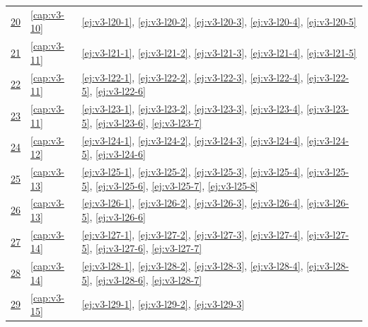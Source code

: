 {\begin{longtable}{@{}p{}p{}p{}@{}}
\href{https://drive.google.com/file/d/1Ys2jkIJ-7adEztSk6RGl4ztBA_OKQQ3G/view?usp=drivesdk}{20} & \ref{cap:v3-10} & \ref{ej:v3-l20-1}, \ref{ej:v3-l20-2}, \ref{ej:v3-l20-3}, \ref{ej:v3-l20-4}, \ref{ej:v3-l20-5} \\
\href{https://drive.google.com/file/d/1krgsZVlQzaqXGHSC2Lgj5padfhqT0eVS/view?usp=drivesdk}{21} & \ref{cap:v3-11} & \ref{ej:v3-l21-1}, \ref{ej:v3-l21-2}, \ref{ej:v3-l21-3}, \ref{ej:v3-l21-4}, \ref{ej:v3-l21-5} \\
\href{https://drive.google.com/file/d/18U-IUicazG7JKrD8dFOLbizRFvYHhrBy/view?usp=drivesdk}{22} & \ref{cap:v3-11} & \ref{ej:v3-l22-1}, \ref{ej:v3-l22-2}, \ref{ej:v3-l22-3}, \ref{ej:v3-l22-4}, \ref{ej:v3-l22-5}, \ref{ej:v3-l22-6} \\
\href{https://drive.google.com/file/d/1XkrNKnGp1XhTe2vJPWRVwAp-CsyaPm2l/view?usp=drivesdk}{23} & \ref{cap:v3-11} & \ref{ej:v3-l23-1}, \ref{ej:v3-l23-2}, \ref{ej:v3-l23-3}, \ref{ej:v3-l23-4}, \ref{ej:v3-l23-5}, \ref{ej:v3-l23-6}, \ref{ej:v3-l23-7} \\
\href{https://drive.google.com/file/d/1noqDj_y_3lDqzf6l07Zaq7fKG8sV4uyz/view?usp=drivesdk}{24} & \ref{cap:v3-12} & \ref{ej:v3-l24-1}, \ref{ej:v3-l24-2}, \ref{ej:v3-l24-3}, \ref{ej:v3-l24-4}, \ref{ej:v3-l24-5}, \ref{ej:v3-l24-6} \\
\href{https://drive.google.com/file/d/1hraUvwDf51iVmjSI1w0fg5lXyf5yazeK/view?usp=drivesdk}{25} & \ref{cap:v3-13} & \ref{ej:v3-l25-1}, \ref{ej:v3-l25-2}, \ref{ej:v3-l25-3}, \ref{ej:v3-l25-4}, \ref{ej:v3-l25-5}, \ref{ej:v3-l25-6}, \ref{ej:v3-l25-7}, \ref{ej:v3-l25-8} \\
\href{https://drive.google.com/file/d/1Wv0f6k7S6CtOnJ6WMh6OFmas63QQRD7p/view?usp=drivesdk}{26} & \ref{cap:v3-13} & \ref{ej:v3-l26-1}, \ref{ej:v3-l26-2}, \ref{ej:v3-l26-3}, \ref{ej:v3-l26-4}, \ref{ej:v3-l26-5}, \ref{ej:v3-l26-6} \\
\href{https://drive.google.com/file/d/1nSokObUFCH7f-PSoPtx-CFUoC7B0Jhyq/view?usp=drivesdk}{27} & \ref{cap:v3-14} & \ref{ej:v3-l27-1}, \ref{ej:v3-l27-2}, \ref{ej:v3-l27-3}, \ref{ej:v3-l27-4}, \ref{ej:v3-l27-5}, \ref{ej:v3-l27-6}, \ref{ej:v3-l27-7} \\
\href{https://drive.google.com/file/d/1mG-Qoosl1IZGCxAIBSpBbplZ7AqPchun/view?usp=drivesdk}{28} & \ref{cap:v3-14} & \ref{ej:v3-l28-1}, \ref{ej:v3-l28-2}, \ref{ej:v3-l28-3}, \ref{ej:v3-l28-4}, \ref{ej:v3-l28-5}, \ref{ej:v3-l28-6}, \ref{ej:v3-l28-7} \\
\href{https://drive.google.com/file/d/1laHYbjLCoOEPyLw9sTLNdwgyHW1JEAEW/view?usp=drivesdk}{29} & \ref{cap:v3-15} & \ref{ej:v3-l29-1}, \ref{ej:v3-l29-2}, \ref{ej:v3-l29-3} \\

\end{longtable}}
